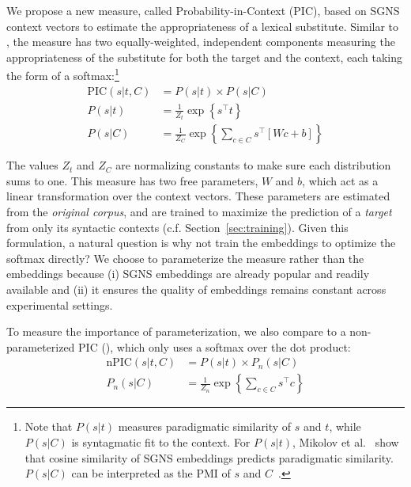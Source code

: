 \hardline

We propose a new measure, called Probability-in-Context (PIC), based
on SGNS context vectors to estimate the appropriateness
of a lexical substitute. Similar to \balAddCos, the measure has two equally-weighted,
independent components measuring the appropriateness of the substitute
for both the target and the context, each taking the form of a
softmax:\footnote{Note that $P(s|t)$ measures paradigmatic similarity
  of $s$ and $t$, while $P(s|C)$ is syntagmatic fit to the
  context.
  For $P(s|t)$,
  Mikolov et al.~ show that cosine
  similarity of SGNS embeddings predicts
  paradigmatic similarity. $P(s|C)$ can be interpreted as the PMI of
  $s$ and $C$~\cite{levy:2014:nips}.}
\begin{align*}
  \mbox{PIC}(s | t, C) &= P(s | t) \times P(s | C)\\
  P(s | t) &= \frac{1}{Z_t}\exp\left\{s^\top t\right\}\\ %
  P(s | C) &= \frac{1}{Z_C}\exp\left\{\sum_{c\in C}s^\top\left[Wc + b\right]\right\}
\end{align*}

The values $Z_t$ and $Z_C$ are normalizing constants to make sure each
distribution sums to one. This measure has two free parameters, $W$ and $b$,
which act as a linear transformation over the context vectors. These parameters
are estimated from the {\em original corpus}, and are trained to maximize
the prediction of a {\em target} from only its syntactic contexts (c.f. Section~\ref{sec:training}).
Given this formulation, a natural question is why not train the embeddings to optimize the
softmax directly? We choose to parameterize the measure rather than the
embeddings because (i) SGNS embeddings are already popular and readily
available and
(ii) it ensures the quality of embeddings remains constant across experimental 
settings.

To measure the importance of parameterization, we
also compare to a non-parameterized PIC (\ourmeas), which only uses a softmax over the
dot product:
\begin{align*}
  \mbox{nPIC}(s | t, C) &= P(s | t) \times P_n(s | C)\\
  P_n(s | C) &= \frac{1}{Z_n}\exp\left\{\sum_{c\in C}s^\top c\right\} %
\end{align*}

%

